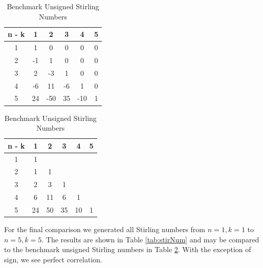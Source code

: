 \begin{table}[H]
    \parbox{.45\linewidth}{
    \centering
    \caption{Stirling Numbers Generated by Script}
    \begin{tabular}{cccccc}
    \hline
    n - k & 1 & 2 & 3 & 4 & 5\\
    \hline
    1 & 1 & 0 & 0 & 0 & 0\\
    
    2 & -1 & 1 & 0 & 0 & 0\\
    
    3 & 2 & -3 & 1 & 0 & 0\\
    
    4 & -6 & 11 & -6 & 1 & 0\\
    
    5 & 24 & -50 & 35 & -10 & 1\\
    \hline
    \end{tabular}
    \label{tab:stirNum}
    }
    \hfill
    \parbox{.45\linewidth}{
    \centering
    \caption{Benchmark Unsigned Stirling Numbers}
    \begin{tabular}{cccccc}
    \hline
    n - k & 1 & 2 & 3 & 4 & 5\\
    \hline
    1 & 1 &  &  &  & \\
    
    2 & 1 & 1 &  &  & \\
    
    3 & 2 & 3 & 1 &  & \\
    
    4 & 6 & 11 & 6 & 1 & \\
    
    5 & 24 & 50 & 35 & 10 & 1\\
    \hline
    \end{tabular}
    \label{tab:stirNumRef}
    }
\end{table}\noindent
For the final comparison we generated all Stirling numbers from $n=1,k=1$ to $n=5,k=5$. The results are shown in Table \ref{tab:stirNum} and may be compared to the benchmark unsigned Stirling numbers in Table \ref{tab:stirNumRef}. With the exception of sign, we see perfect correlation.

